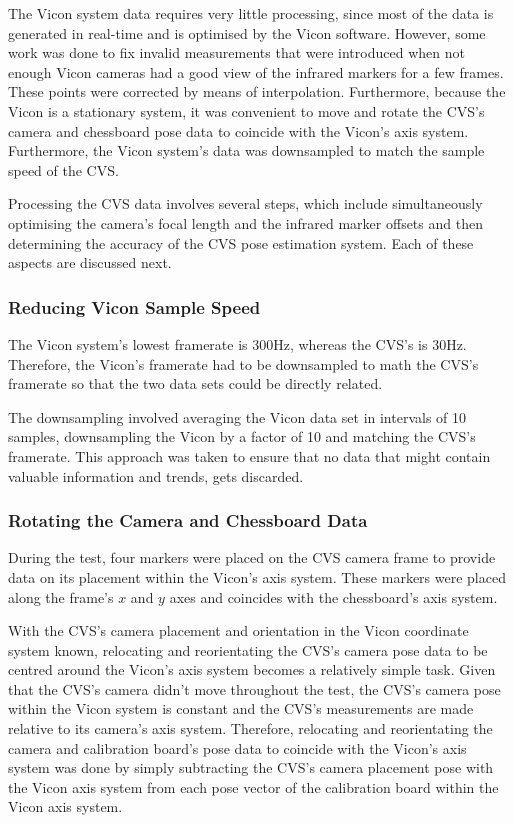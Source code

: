 The Vicon system data requires very little processing, since most of the data is generated in real-time and is optimised by the Vicon software. However, some work was done to fix invalid measurements that were introduced when not enough Vicon cameras had a good view of the infrared markers for a few frames. These points were corrected by means of interpolation. Furthermore, because the Vicon is a stationary system, it was convenient to move and rotate the CVS's camera and chessboard pose data to coincide with the Vicon's axis system. Furthermore, the Vicon system's data was downsampled to match the sample speed of the CVS. 

Processing the CVS data involves several steps, which include simultaneously optimising the camera's focal length and the infrared marker offsets and then determining the accuracy of the CVS pose estimation system. Each of these aspects are discussed next.

\subsubsection{Reducing Vicon Sample Speed}

The Vicon system's lowest framerate is 300Hz, whereas the CVS's is 30Hz. Therefore, the Vicon's framerate had to be downsampled to math the CVS's framerate so that the two data sets could be directly related. 

The downsampling involved averaging the Vicon data set in intervals of 10 samples, downsampling the Vicon by a factor of 10 and matching the CVS's framerate. This approach was taken to ensure that no data that might contain valuable information and trends, gets discarded. 

\subsubsection{Rotating the Camera and Chessboard Data}
\label{sec:rotate-axes}

During the test, four markers were placed on the CVS camera frame to provide data on its placement within the Vicon's axis system. These markers were placed along the frame's $x$ and $y$ axes and coincides with the chessboard's axis system. 

With the CVS's camera placement and orientation in the Vicon coordinate system known, relocating and reorientating the CVS's camera pose data to be centred around the Vicon's axis system becomes a relatively simple task. Given that the CVS's camera didn't move throughout the test, the CVS's camera pose within the Vicon system is constant and the CVS's measurements are made relative to its camera's axis system. Therefore, relocating and reorientating the camera and calibration board's pose data to coincide with the Vicon's axis system was done by simply subtracting the CVS's camera placement pose with the Vicon axis system from each pose vector of the calibration board within the Vicon axis system.

